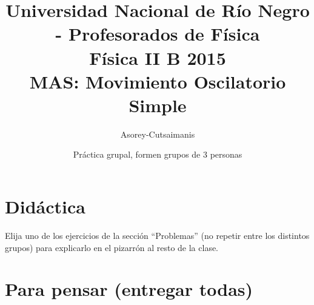 \documentclass[a4paper,12pt]{article}
\begin{document}
\title{
{\normalsize{Universidad Nacional de Río Negro - Profesorados de Física}}\\
Física II B 2015\\MAS: Movimiento Oscilatorio Simple\\}
\author{Asorey-Cutsaimanis}
\date{Práctica grupal, formen grupos de 3 personas}
\maketitle

\section{Didáctica}

Elija uno de los ejercicios de la sección ``Problemas'' (no repetir entre los
distintos grupos) para explicarlo en el pizarrón al resto de la clase. 

\section{Para pensar (entregar todas)}
\end{document}
